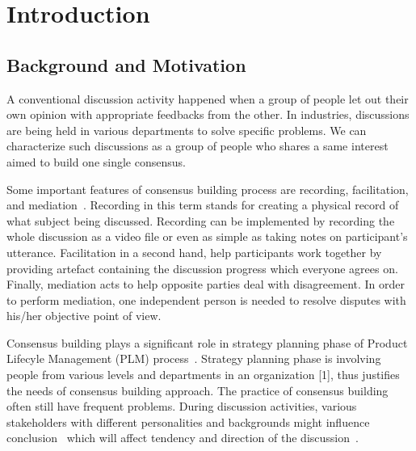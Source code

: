 \documentclass[senior]{IPSstyle}
\begin{document}
\makepreliminarypages
\singlespace
\frontmatter
\tableofcontents
\listoffigures
\listoftables
\mainmatter
\clearemptydoublepage
\setlength{\baselineskip}{23.0pt}

\chapter{Introduction} 

\section{Background and Motivation}

A conventional discussion activity happened when a group of people let out their own opinion with appropriate feedbacks from the other. In industries, discussions are being held in various departments to solve specific problems. We can characterize such discussions as a group of people who shares a same interest aimed to build one single consensus.

Some important features of consensus building process are recording, facilitation, and mediation~\cite{susskind}. Recording in this term stands for creating a physical record of what subject being discussed. Recording can be implemented by recording the whole discussion as a video file or even as simple as taking notes on participant’s utterance. Facilitation in a second hand, help participants work together by providing artefact containing the discussion progress which everyone agrees on. Finally, mediation acts to help opposite parties deal with disagreement. In order to perform mediation, one independent person is needed to resolve disputes with his/her objective point of view.

Consensus building plays a significant role in strategy planning phase of Product Lifecyle Management (PLM) process~\cite{stark}. Strategy planning phase is involving people from various levels and departments in an organization [1], thus justifies the needs of consensus building approach. The practice of consensus building often still have frequent problems. During discussion activities, various stakeholders with different personalities and backgrounds might influence conclusion~\cite{he} which will affect tendency and direction of the discussion~\cite{goto1}.
\end{document}
